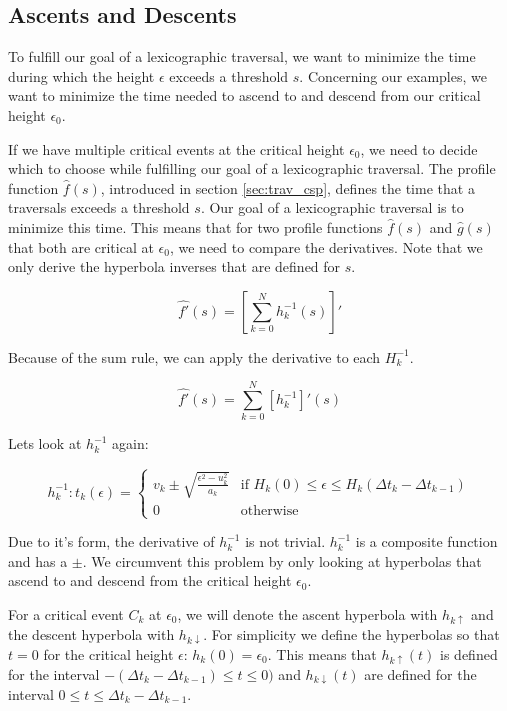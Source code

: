 \subsection{Ascents and Descents}

To fulfill our goal of a lexicographic traversal, we want to minimize the time during which the height $\epsilon$ exceeds a threshold $s$.\cite{rotelex} Concerning our examples, we want to minimize the time needed to ascend to and descend from our critical height $\epsilon_0$.

If we have multiple critical events at the critical height $\epsilon_0$, we need to decide which to choose while fulfilling our goal of a lexicographic traversal. The profile function $\hat{f}(s)$, introduced in section \ref{sec:trav_csp}, defines the time that a traversals exceeds a threshold $s$. Our goal of a lexicographic traversal is to minimize this time. This means that for two profile functions $\hat{f}(s)$ and $\hat{g}(s)$ that both are critical at $\epsilon_0$, we need to compare the derivatives. Note that we only derive the hyperbola inverses that are defined for $s$.

$$\hat{f'}(s) = \left[ \sum_{k=0}^N {h_k^{-1}(s)} \right]'$$

Because of the sum rule, we can apply the derivative to each $H_k^{-1}$.

$$\hat{f'}(s) = \sum_{k=0}^N {[h_k^{-1}]'(s)}$$

Lets look at $h_k^{-1}$ again:

\[
h_k^{-1}: t_k(\epsilon) = 
\begin{cases}
	{v_k \pm \sqrt{\frac{\epsilon^2 - u_k^2}{a_k}}}	& \text{if } {H_k(0) \leq \epsilon \leq H_k({\Delta t}_k - {\Delta t}_{k-1})}\\
	0        										& \text{otherwise}
\end{cases}
\]

Due to it's form, the derivative of $h_k^{-1}$ is not trivial. $h_k^{-1}$ is a composite function and has a $\pm$. We circumvent this problem by only looking at hyperbolas that ascend to and descend from the critical height $\epsilon_0$.

For a critical event $C_k$ at $\epsilon_0$, we will denote the ascent hyperbola with $h_{k\uparrow}$ and the descent hyperbola with $h_{k\downarrow}$.  For simplicity we define the hyperbolas so that $t = 0$ for the critical height $\epsilon$: $h_k(0) = \epsilon_0$. This means that $h_{k\uparrow}(t)$ is defined for the interval $-( {\Delta t}_k - {\Delta t}_{k-1} ) \leq t \leq 0)$ and $h_{k\downarrow}(t)$ are defined for the interval $0 \leq t \leq {\Delta t}_k - {\Delta t}_{k-1}$.

